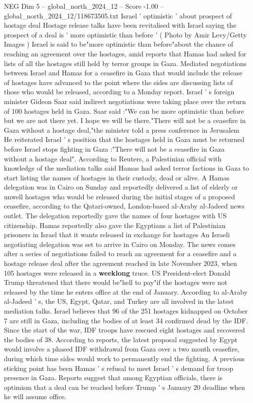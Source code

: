 \begin{textsample}{NEG Dim 5 – global\_north\_2024\_12 – Score -1.00 – global\_north\_2024\_12/118673505.txt}  \label{ex:f5_neg_351}
Israel ' optimistic ' about prospect of hostage deal Hostage release talks have been revitalised with Israel saying the prospect of a deal is ' more optimistic than before ' ( Photo by Amir Levy/Getty Images ) Israel is said to be"more optimistic than before"about the chance of reaching an agreement over the hostages, amid reports that Hamas had asked for lists of all the hostages still held by terror groups in Gaza.
Mediated negotiations between Israel and Hamas for a ceasefire in Gaza that would include the release of hostages have advanced to the point where the sides are discussing lists of those who would be released, according to a Monday report.
Israel ' s foreign minister Gideon Saar said indirect negotiations were taking place over the return of 100 hostages held in Gaza.
Saar said :"We can be more optimistic than before but we are not there yet.
I hope we will be there."There will not be a ceasefire in Gaza without a hostage deal,"the minister told a press conference in Jerusalem He reiterated Israel ' s position that the hostages held in Gaza must be returned before Israel stops fighting in Gaza :"There will not be a ceasefire in Gaza without a hostage deal".
According to Reuters, a Palestinian official with knowledge of the mediation talks said Hamas had asked terror factions in Gaza to start listing the names of hostages in their custody, dead or alive.
A Hamas delegation was in Cairo on Sunday and reportedly delivered a list of elderly or unwell hostages who would be released during the initial stages of a proposed ceasefire, according to the Qatari-owned, London-based al-Araby al-Jadeed news outlet.
The delegation reportedly gave the names of four hostages with US citizenship.
Hamas reportedly also gave the Egyptians a list of Palestinian prisoners in Israel that it wants released in exchange for hostages An Israeli negotiating delegation was set to arrive in Cairo on Monday.
The news comes after a series of negotiations failed to reach an agreement for a ceasefire and a hostage release deal after the agreement reached in late November 2023, when 105 hostages were released in a \textbf{weeklong} truce.
US President-elect Donald Trump threatened that there would be"hell to pay"if the hostages were not released by the time he enters office at the end of January.
According to al-Araby al-Jadeed ' s, the US, Egypt, Qatar, and Turkey are all involved in the latest mediation talks.
Israel believes that 96 of the 251 hostages kidnapped on October 7 are still in Gaza, including the bodies of at least 34 confirmed dead by the IDF.
Since the start of the war, IDF troops have rescued eight hostages and recovered the bodies of 38.
According to reports, the latest proposal suggested by Egypt would involve a phased IDF withdrawal from Gaza over a two month ceasefire, during which time sides would work to permanently end the fighting.
A previous sticking point has been Hamas ' s refusal to meet Israel ' s demand for troop presence in Gaza.
Reports suggest that among Egyptian officials, there is optimism that a deal can be reached before Trump ' s January 20 deadline when he will assume office.

\end{textsample}
